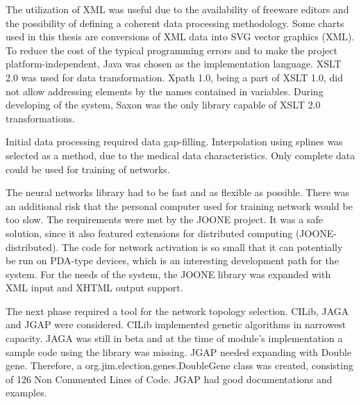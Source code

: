 \documentclass[10pt,oneside]{memoir}
\begin{document}
The utilization of XML was useful due to the availability of freeware editors and the possibility of defining a coherent data processing methodology. Some charts used in this thesis are conversions of XML data into SVG vector graphics (XML). To reduce the cost of the typical programming errors and to make the project platform-independent, Java was chosen as the implementation language.
XSLT 2.0 was used for data transformation. Xpath 1.0, being a part of XSLT 1.0, did not allow addressing elements by the names contained in variables.  During developing of the system, Saxon was the only library capable of XSLT 2.0 transformations.


Initial data processing required data gap-filling. Interpolation using splines was selected as a method, due to the medical data characteristics. Only complete data could be used for training of networks.


The neural networks library had to be fast and as flexible as possible. There was an additional risk that the personal computer used for training network would be too slow. The requirements were met by the JOONE project. It was a safe solution, since it also featured extensions for distributed computing (JOONE-distributed). The code for network activation is so small that it can potentially be run on PDA-type devices, which is an interesting development path for the system. For the needs of the system, the JOONE library was expanded with XML input and XHTML output support.


The next phase required a tool for the network topology selection. CILib, JAGA and JGAP were considered. CILib implemented genetic algorithms in narrowest capacity. JAGA was still in beta and at the time of module's implementation a sample code using the library was missing. JGAP needed expanding with Double gene. Therefore, a org.jim.election.genes.DoubleGene class was created, consisting of 126 Non Commented Lines of Code. JGAP had good documentations and examples.
\end{document}

